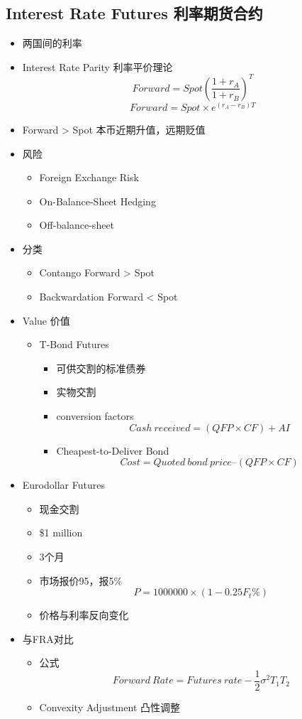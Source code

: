 \documentclass[a4paper,6pt,twoside,openany]{article}
\begin{document}
\subsection{Interest Rate Futures 利率期货合约}
\begin{itemize}
\item 两国间的利率
\item Interest Rate Parity 利率平价理论
  $$Forward = Spot(\frac{1 + r_A}{1 + r_B})^T$$
  $$Forward = Spot \times e^{(r_A - r_B)T}$$
\item Forward > Spot 本币近期升值，远期贬值
\item 风险
  \begin{itemize}
  \item Foreign Exchange Risk
  \item On-Balance-Sheet Hedging
  \item Off-balance-sheet

  \end{itemize}
\item 分类
  \begin{itemize}
  \item Contango Forward > Spot
  \item Backwardation Forward < Spot
  \end{itemize}
\item Value 价值
  \begin{itemize}
  \item T-Bond Futures
    \begin{itemize}
    \item 可供交割的标准债券
    \item 实物交割
    \item conversion factors
      $$Cash\ received = (QFP \times CF) + AI$$
    \item Cheapest-to-Deliver Bond
      $$Cost = Quoted\ bond\ price – (QFP \times CF)$$
    \end{itemize}
  \end{itemize}
\item Eurodollar Futures
  \begin{itemize}
  \item 现金交割
  \item \$1 million
  \item 3个月
  \item 市场报价95，报5\%
    $$P = 1000000 \times (1 - 0.25 F_t\%)$$
  \item 价格与利率反向变化
  \end{itemize}
\item 与FRA对比
  \begin{itemize}
  \item 公式 $$Forward\ Rate = Futures\ rate - \frac{1}{2}\sigma^2T_1T_2$$
  \item Convexity Adjustment 凸性调整
  \end{itemize}
\end{itemize}
    
\end{document}
